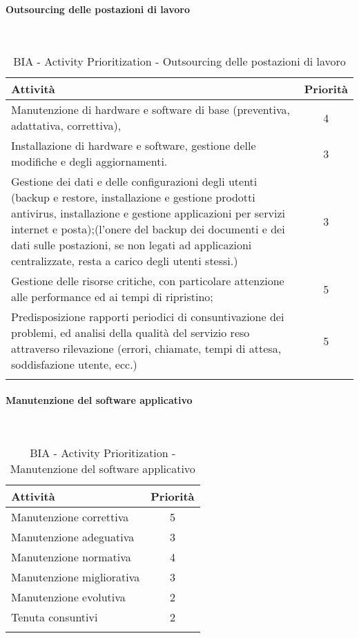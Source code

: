 \newpage
\paragraph{Outsourcing delle postazioni di lavoro}
\textcolor{white}{.} \\
\renewcommand\arraystretch{1,5}
\begin{longtable}{p{11cm} c }
\toprule
\textbf{Attività} & \textbf{Priorità} \\
\toprule
Manutenzione   di   hardware   e   software   di   base   (preventiva,   adattativa,   correttiva), & 4 \\
Installazione di hardware e software, gestione delle modifiche e degli aggiornamenti.  & 3 \\
Gestione  dei  dati  e  delle  configurazioni  degli  utenti  (backup  e  restore,  installazione  e gestione  prodotti  antivirus,  installazione  e  gestione  applicazioni  per  servizi  internet  e 
posta);(l’onere del backup dei documenti e dei dati sulle postazioni, se non legati ad applicazioni centralizzate, resta a carico degli utenti stessi.)  & 3 \\
Gestione delle risorse critiche, con particolare attenzione alle performance ed ai tempi di ripristino;   & 5 \\
Predisposizione rapporti periodici di consuntivazione dei problemi, ed analisi della qualità del  servizio  reso  attraverso  rilevazione  (errori,  chiamate,  tempi  di  attesa,  soddisfazione utente, ecc.)  & 5 \\
\bottomrule
\caption{BIA - Activity Prioritization - Outsourcing delle postazioni di lavoro}
\end{longtable}

\paragraph{Manutenzione del software applicativo}
\textcolor{white}{.} \\
\renewcommand\arraystretch{1,5}
\begin{longtable}{p{11cm} c }
\toprule
\textbf{Attività} & \textbf{Priorità} \\
\toprule
Manutenzione correttiva &5 \\
Manutenzione adeguativa & 3 \\
Manutenzione normativa & 4 \\
Manutenzione migliorativa & 3 \\
Manutenzione evolutiva & 2 \\
Tenuta consuntivi & 2 \\
\bottomrule
\caption{BIA - Activity Prioritization - Manutenzione del software applicativo}
\end{longtable}

